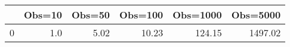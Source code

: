 \begin{tabular}{lrrrrr}
\toprule
{} &  Obs=10 &  Obs=50 &  Obs=100 &  Obs=1000 &  Obs=5000 \\
\midrule
0 &     1.0 &    5.02 &    10.23 &    124.15 &   1497.02 \\
\bottomrule
\end{tabular}

